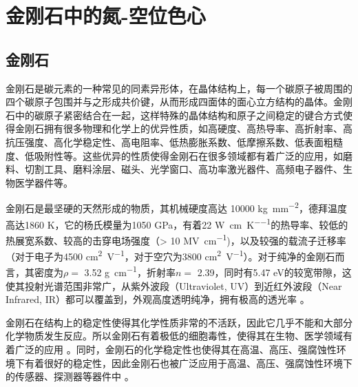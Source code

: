 \documentclass[type = bachelor]{whu-thesis}
\begin{document}

\chapter{金刚石中的氮-空位色心}

\section{金刚石}
金刚石是碳元素的一种常见的同素异形体，在晶体结构上，每一个碳原子被周围的四个碳原子包围并与之形成共价键，从而形成四面体的面心立方结构的晶体。金刚石中的碳原子紧密结合在一起，这样特殊的晶体结构和原子之间稳定的键合方式使得金刚石拥有很多物理和化学上的优异性质，如高硬度、高热导率、高折射率、高抗压强度、高化学稳定性、高电阻率、低热膨胀系数、低摩擦系数、低表面粗糙度、低吸附性等。这些优异的性质使得金刚石在很多领域都有着广泛的应用，如磨料、切割工具、磨料涂层、磁头、光学窗口、高功率激光器件、高频电子器件、生物医学器件等。

金刚石是最坚硬的天然形成的物质，其机械硬度高达 10000 \unit{\kilogram\per\milli\meter\squared}，德拜温度高达1860 \unit{\kelvin}，它的杨氏模量为1050 \unit{\GPa}，有着22 \unit{\watt\per\centi\meter\per\kelvin}的热导率、较低的热展宽系数、较高的击穿电场强度（> 10 \unit{\mega\volt\per\centi\meter})，以及较强的载流子迁移率（对于电子为4500 \unit{\centi\meter\squared\per\volt}，对于空穴为3800 \unit{\centi\meter\squared\per\volt}）。对于纯净的金刚石而言，其密度为$\rho =$ 3.52 \unit{\g\per\cm}，折射率$n =$ 2.39，同时有5.47 \unit{\electronvolt}的较宽带隙，这使其投射光谱范围非常广，从紫外波段（Ultraviolet, UV）到近红外波段（Near Infrared, IR）都可以覆盖到，外观高度透明纯净，拥有极高的透光率 \cite{mildren2013optical, lonvcar2013quantum}。

金刚石在结构上的稳定性使得其化学性质非常的不活跃，因此它几乎不能和大部分化学物质发生反应。所以金刚石有着极低的细胞毒性，使得其在生物、医学领域有着广泛的应用 \cite{schirhagl2014nitrogen,wu2016diamond}。同时，金刚石的化学稳定性也使得其在高温、高压、强腐蚀性环境下有着很好的稳定性，因此金刚石也被广泛应用于高温、高压、强腐蚀性环境下的传感器、探测器等器件中 \cite{umezawa2012high, jayaraman1983diamond}。
\end{document}

